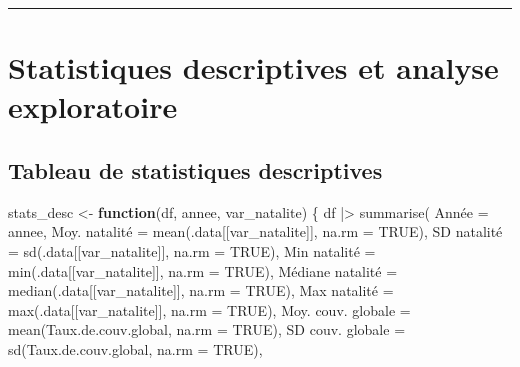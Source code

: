 \documentclass[
  letterpaper,
  DIV=11,
  numbers=noendperiod]{scrartcl}
\newenvironment{Shaded}{\begin{snugshade}}{\end{snugshade}}
\newcommand{\AttributeTok}[1]{\textcolor[rgb]{0.40,0.45,0.13}{#1}}
\newcommand{\ConstantTok}[1]{\textcolor[rgb]{0.56,0.35,0.01}{#1}}
\newcommand{\ControlFlowTok}[1]{\textcolor[rgb]{0.00,0.23,0.31}{\textbf{#1}}}
\newcommand{\FunctionTok}[1]{\textcolor[rgb]{0.28,0.35,0.67}{#1}}
\newcommand{\NormalTok}[1]{\textcolor[rgb]{0.00,0.23,0.31}{#1}}
\newcommand{\OtherTok}[1]{\textcolor[rgb]{0.00,0.23,0.31}{#1}}
\newcommand{\SpecialCharTok}[1]{\textcolor[rgb]{0.37,0.37,0.37}{#1}}
\newcommand{\StringTok}[1]{\textcolor[rgb]{0.13,0.47,0.30}{#1}}
\begin{document}
\begin{center}\rule{0.5\linewidth}{0.5pt}\end{center}

\section{Statistiques descriptives et analyse
exploratoire}\label{statistiques-descriptives-et-analyse-exploratoire}

\subsection{Tableau de statistiques
descriptives}\label{tableau-de-statistiques-descriptives}

\begin{Shaded}
\begin{Highlighting}[]
\NormalTok{stats\_desc }\OtherTok{\textless{}{-}} \ControlFlowTok{function}\NormalTok{(df, annee, var\_natalite) \{}
\NormalTok{  df }\SpecialCharTok{|\textgreater{}}
    \FunctionTok{summarise}\NormalTok{(}
\NormalTok{      Année                }\OtherTok{=}\NormalTok{ annee,}
      \StringTok{\textasciigrave{}}\AttributeTok{Moy. natalité}\StringTok{\textasciigrave{}}      \OtherTok{=} \FunctionTok{mean}\NormalTok{(.data[[var\_natalite]], }\AttributeTok{na.rm =} \ConstantTok{TRUE}\NormalTok{),}
      \StringTok{\textasciigrave{}}\AttributeTok{SD natalité}\StringTok{\textasciigrave{}}        \OtherTok{=} \FunctionTok{sd}\NormalTok{(.data[[var\_natalite]], }\AttributeTok{na.rm =} \ConstantTok{TRUE}\NormalTok{),}
      \StringTok{\textasciigrave{}}\AttributeTok{Min natalité}\StringTok{\textasciigrave{}}       \OtherTok{=} \FunctionTok{min}\NormalTok{(.data[[var\_natalite]], }\AttributeTok{na.rm =} \ConstantTok{TRUE}\NormalTok{),}
      \StringTok{\textasciigrave{}}\AttributeTok{Médiane natalité}\StringTok{\textasciigrave{}}   \OtherTok{=} \FunctionTok{median}\NormalTok{(.data[[var\_natalite]], }\AttributeTok{na.rm =} \ConstantTok{TRUE}\NormalTok{),}
      \StringTok{\textasciigrave{}}\AttributeTok{Max natalité}\StringTok{\textasciigrave{}}       \OtherTok{=} \FunctionTok{max}\NormalTok{(.data[[var\_natalite]], }\AttributeTok{na.rm =} \ConstantTok{TRUE}\NormalTok{),}
      \StringTok{\textasciigrave{}}\AttributeTok{Moy. couv. globale}\StringTok{\textasciigrave{}} \OtherTok{=} \FunctionTok{mean}\NormalTok{(Taux.de.couv.global, }\AttributeTok{na.rm =} \ConstantTok{TRUE}\NormalTok{),}
      \StringTok{\textasciigrave{}}\AttributeTok{SD couv. globale}\StringTok{\textasciigrave{}}   \OtherTok{=} \FunctionTok{sd}\NormalTok{(Taux.de.couv.global, }\AttributeTok{na.rm =} \ConstantTok{TRUE}\NormalTok{),}

\end{Highlighting}
\end{Shaded}
\end{document}
